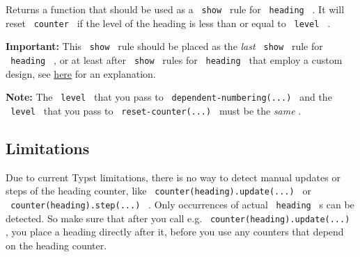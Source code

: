 \begin{enumerate}
\begin{itemize}
    Returns a function that should be used as a \texttt{\ show\ } rule
    for \texttt{\ heading\ } . It will reset \texttt{\ counter\ } if the
    level of the heading is less than or equal to \texttt{\ level\ } .
  \end{itemize}

  \textbf{Important:} This \texttt{\ show\ } rule should be placed as
  the \emph{last} \texttt{\ show\ } rule for \texttt{\ heading\ } , or
  at least after \texttt{\ show\ } rules for \texttt{\ heading\ } that
  employ a custom design, see
  \href{https://forum.typst.app/t/i-figured-broken-with-custom-template/1730/10?u=jbirnick}{here}
  for an explanation.

\begin{Shaded}
\begin{Highlighting}[]







\end{Highlighting}
\end{Shaded}
\end{enumerate}

\textbf{Note:} The \texttt{\ level\ } that you pass to
\texttt{\ dependent-numbering(...)\ } and the \texttt{\ level\ } that
you pass to \texttt{\ reset-counter(...)\ } must be the \emph{same} .

\subsection{Limitations}\label{limitations}

Due to current Typst limitations, there is no way to detect manual
updates or steps of the heading counter, like
\texttt{\ counter(heading).update(...)\ } or
\texttt{\ counter(heading).step(...)\ } . Only occurrences of actual
\texttt{\ heading\ } s can be detected. So make sure that after you call
e.g. \texttt{\ counter(heading).update(...)\ } , you place a heading
directly after it, before you use any counters that depend on the
heading counter.

